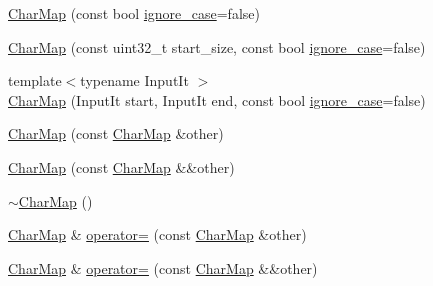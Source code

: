 \begin{DoxyCompactItemize}
\item 
\mbox{\hyperlink{classlucene_1_1core_1_1analysis_1_1characterutil_1_1CharMap_ab593676daf8740d5f8394fabac807460}{Char\+Map}} (const bool \mbox{\hyperlink{classlucene_1_1core_1_1analysis_1_1characterutil_1_1CharMap_a1a62994159ecb2e6767c0d67238ad35c}{ignore\+\_\+case}}=false)
\item 
\mbox{\hyperlink{classlucene_1_1core_1_1analysis_1_1characterutil_1_1CharMap_a797c76287d00853e737c8fcd8006769d}{Char\+Map}} (const uint32\+\_\+t start\+\_\+size, const bool \mbox{\hyperlink{classlucene_1_1core_1_1analysis_1_1characterutil_1_1CharMap_a1a62994159ecb2e6767c0d67238ad35c}{ignore\+\_\+case}}=false)
\item 
{\footnotesize template$<$typename Input\+It $>$ }\\\mbox{\hyperlink{classlucene_1_1core_1_1analysis_1_1characterutil_1_1CharMap_a7449492bf51315ef11481821b113c0f1}{Char\+Map}} (Input\+It start, Input\+It end, const bool \mbox{\hyperlink{classlucene_1_1core_1_1analysis_1_1characterutil_1_1CharMap_a1a62994159ecb2e6767c0d67238ad35c}{ignore\+\_\+case}}=false)
\item 
\mbox{\hyperlink{classlucene_1_1core_1_1analysis_1_1characterutil_1_1CharMap_a0698d6cda30fd0a977a59ada5486f0b8}{Char\+Map}} (const \mbox{\hyperlink{classlucene_1_1core_1_1analysis_1_1characterutil_1_1CharMap}{Char\+Map}} \&other)
\item 
\mbox{\hyperlink{classlucene_1_1core_1_1analysis_1_1characterutil_1_1CharMap_aa83b5c7a819e10d002d8d06bc6ad45a0}{Char\+Map}} (const \mbox{\hyperlink{classlucene_1_1core_1_1analysis_1_1characterutil_1_1CharMap}{Char\+Map}} \&\&other)
\item 
\mbox{\hyperlink{classlucene_1_1core_1_1analysis_1_1characterutil_1_1CharMap_aa149df587eab8317179428d588f4829d}{$\sim$\+Char\+Map}} ()
\item 
\mbox{\hyperlink{classlucene_1_1core_1_1analysis_1_1characterutil_1_1CharMap}{Char\+Map}} \& \mbox{\hyperlink{classlucene_1_1core_1_1analysis_1_1characterutil_1_1CharMap_aabcf4f0d534fb6050aeb140d418a0fba}{operator=}} (const \mbox{\hyperlink{classlucene_1_1core_1_1analysis_1_1characterutil_1_1CharMap}{Char\+Map}} \&other)
\item 
\mbox{\hyperlink{classlucene_1_1core_1_1analysis_1_1characterutil_1_1CharMap}{Char\+Map}} \& \mbox{\hyperlink{classlucene_1_1core_1_1analysis_1_1characterutil_1_1CharMap_adef93a87f617af2b3f949b40ffd82cca}{operator=}} (const \mbox{\hyperlink{classlucene_1_1core_1_1analysis_1_1characterutil_1_1CharMap}{Char\+Map}} \&\&other)

\end{DoxyCompactItemize}
